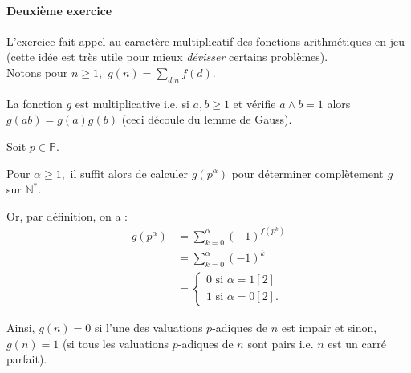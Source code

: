 \paragraph{Deuxième exercice}

L'exercice fait appel au caractère multiplicatif des fonctions arithmétiques en jeu (cette idée est très utile pour mieux \emph{dévisser} certains problèmes).\\

Notons pour $n\geq 1,$ $\displaystyle g(n)=\sum_{d|n}f(d).$ 

La fonction $g$ est multiplicative i.e. si $a,b\geq 1$ et vérifie $a\wedge b=1$ alors $\displaystyle g(ab)=g(a)g(b)$ (ceci découle du lemme de Gauss).

Soit $p\in \mathbb{P}.$ 

Pour $\alpha\geq 1,$ il suffit alors de calculer $g(p^{\alpha})$ pour déterminer complètement $g$ sur $\mathbb{N}^{*}.$

Or, par définition, on a :
\begin{align*}
g(p^{\alpha}) & =\sum_{k=0}^{\alpha}(-1)^{f(p^{k})}\\
& =\sum_{k=0}^{\alpha}(-1)^{k}\\
& =\left\{ \begin{array}{l}
0 \mbox{ si } \alpha=1 [2]\\
1 \mbox{ si } \alpha=0 [2].
\end{array}\right.
\end{align*}

Ainsi, $g(n)=0$ si l'une des valuations $p$-adiques de $n$ est impair et sinon, $g(n)=1$ (si tous les valuations $p$-adiques de $n$ sont pairs i.e. $n$ est un carré parfait).

